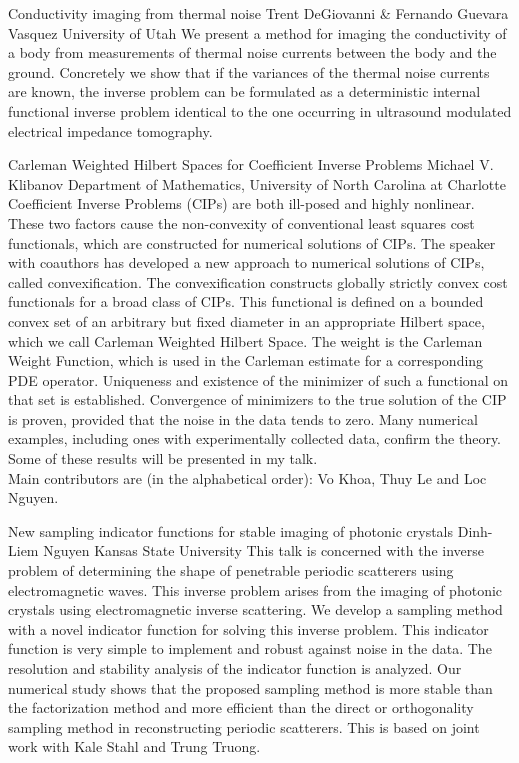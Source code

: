 \begin{addmargin}[2em]{0em}
\vspace{1.5ex}

\abs
{Conductivity imaging from thermal noise}
{Trent DeGiovanni \& Fernando Guevara Vasquez}
{University of Utah}
{We present a method for imaging the conductivity of a body from measurements of thermal noise currents between the body and the ground. Concretely we show that if the variances of the thermal noise currents are known, the inverse problem can be formulated as a deterministic internal functional inverse problem identical to the one occurring in ultrasound modulated electrical impedance tomography.}


\vspace{1.5ex}
\abs
{Carleman Weighted Hilbert Spaces for Coefficient Inverse Problems}
{Michael V. Klibanov}
{Department of Mathematics, University of North Carolina at Charlotte}
{Coefficient Inverse Problems (CIPs) are both ill-posed and highly nonlinear. These two factors cause the non-convexity of conventional least squares cost functionals, which are constructed for numerical solutions of CIPs. The speaker with coauthors has developed a new approach to numerical solutions of CIPs, called convexification. The convexification constructs globally strictly convex cost functionals for a broad class of CIPs. This functional is defined on a bounded convex set of an arbitrary but fixed diameter in an appropriate Hilbert space, which we call Carleman Weighted Hilbert Space. The weight is the Carleman Weight Function, which is used in the Carleman estimate for a corresponding PDE operator. Uniqueness and existence of the minimizer of such a functional on that set is established. Convergence of minimizers to the true solution of the CIP is proven, provided that the noise in the data tends to zero. Many numerical examples, including ones with experimentally collected data, confirm the theory.\\
Some of these results will be presented in my talk.\\
Main contributors are (in the alphabetical order): Vo Khoa, Thuy Le and Loc Nguyen.}


\vspace{1.5ex}
\abs
{New sampling indicator functions for stable imaging of photonic crystals}
{Dinh-Liem Nguyen}
{Kansas State University}
{This talk is concerned with the inverse problem of determining the shape of penetrable periodic scatterers using electromagnetic waves. This inverse problem arises from the imaging of photonic crystals using electromagnetic inverse scattering. We develop a sampling method with a novel indicator function for solving this inverse problem. This indicator function is very simple to implement and robust against noise in the data. The resolution and stability analysis of the indicator function is analyzed. Our numerical study shows that the proposed sampling method is more stable than the factorization method and more efficient than the direct or orthogonality sampling method in reconstructing periodic scatterers. This is based on joint work with Kale Stahl and Trung Truong.}



\end{addmargin}
